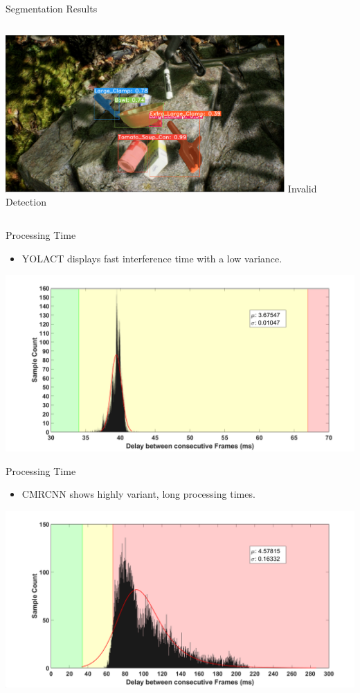 \documentclass[18pt]{beamer}
\begin{document}
\begin{frame}{Segmentation Results}
\begin{columns}
\begin{column}{0.5\textwidth}
        \includegraphics[width=0.8\textwidth]{figures/fat_example_invalid.pdf}
        \vfill
        Invalid Detection
    \end{column}
\end{columns}
\end{frame}

\begin{frame}{Processing Time}
    \begin{itemize}
        \item YOLACT displays fast interference time with a low variance.
    \end{itemize}
    \includegraphics[width=\textwidth]{figures/graphs/dist_yolact_mobilenetv2.png}
\end{frame}

\begin{frame}{Processing Time}
    \begin{itemize}
        \item CMRCNN shows highly variant, long processing times.
    \end{itemize}
    \includegraphics[width=\textwidth]{figures/graphs/dist_cmrcnn_mobilenetv2.png}
\end{frame}
\end{document}
